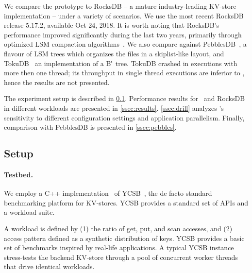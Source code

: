 We  compare the \sys\/ prototype to RocksDB -- a mature industry-leading KV-store implementation  -- under a variety of scenarios.  We use the most recent RocksDB release 5.17.2, available Oct 24, 2018.  
It is worth noting that RocksDB's performance improved significantly during the last two years, primarily through 
optimized LSM compaction algorithms~\cite{CallaghanCompaction}.   We also compare against PebblesDB~\cite{PebblesDB}, a flavour of LSM trees which organizes the files in a skiplist-like layout, and TokuDB~\cite{TokuDB} an implementation of a B$^\epsilon$ tree. TokuDB crashed in executions with more then one thread; its throughput in single thread executions are inferior to \sys, hence the results are not presented.

The experiment setup is described in \cref{ssec:setup}. 
Performance results for \sys\ and RocksDB in 
different workloads are presented in \cref{ssec:results}. 
\cref{ssec:drill} analyzes \sys's sensitivity to different configuration settings and application parallelism. Finally, comparison with PebblesDB is presented in \cref{ssec:pebbles}.
 

\subsection{Setup}
\label{ssec:setup} 

\paragraph{Testbed.} We employ a C++ implementation~\cite{Cpp-YCSB} of YCSB~\cite{YCSB}, the  de facto standard  
benchmarking platform for KV-stores. 
YCSB provides a standard set of APIs and a workload suite. 

A workload is defined by  (1) the ratio of get, put, and scan accesses, and (2) access pattern defined as a synthetic distribution of keys. 
YCSB provides a basic set of benchmarks  inspired by real-life applications.
A typical YCSB instance stress-tests the backend KV-store through a pool of concurrent worker threads that drive identical
workloads. %

